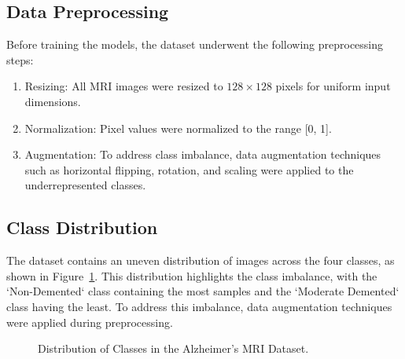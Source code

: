 \documentclass[runningheads]{llncs}
\begin{document}
\subsection{Data Preprocessing}
Before training the models, the dataset underwent the following preprocessing steps:
\begin{enumerate}
    \item Resizing: All MRI images were resized to $128 \times 128$ pixels for uniform input dimensions.
    \item Normalization: Pixel values were normalized to the range [0, 1].
    \item Augmentation: To address class imbalance, data augmentation techniques such as horizontal flipping, rotation, and scaling were applied to the underrepresented classes.
\end{enumerate}

\subsection{Class Distribution}
The dataset contains an uneven distribution of images across the four classes, as shown in Figure~\ref{fig:class_distribution}. This distribution highlights the class imbalance, with the `Non-Demented` class containing the most samples and the `Moderate Demented` class having the least. To address this imbalance, data augmentation techniques were applied during preprocessing.

\begin{figure}[htbp]
    \centering
    \caption{Distribution of Classes in the Alzheimer's MRI Dataset.}
    \label{fig:class_distribution}
\end{figure}
\end{document}
